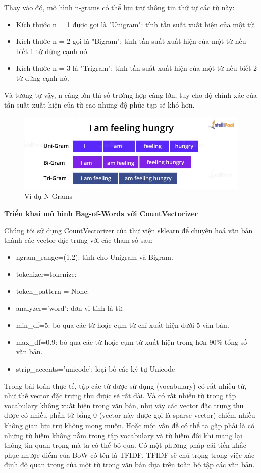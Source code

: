 \documentclass[12pt,a4paper,oneside]{book}
\begin{document}
	Thay vào đó, mô hình n-grams có thể lưu trữ thông tin thứ tự các từ này:
	\begin{itemize}
		\item Kích thước n = 1 được gọi là "Unigram": tính tần suất xuất hiện của một từ.
		\item Kích thước n = 2 gọi là "Bigram": tính tần suất xuất hiện của một từ nếu biết 1 từ đứng cạnh nó.
		\item Kích thước n = 3 là "Trigram": tính tần suất xuất hiện của một từ nếu biết 2 từ đứng cạnh nó.
	\end{itemize}
	Và tương tự vậy, n càng lớn thì số trường hợp càng lớn, tuy cho độ chính xác của tần suất xuất hiện của từ cao nhưng độ phức tạp sẽ khó hơn. 
	\begin{figure}[H]
		\begin{center}
			\includegraphics[width=0.8\columnwidth]{ngrams.jpg}
		\end{center}
		\caption{Ví dụ N-Grams}
	\end{figure}
	
	
	\textbf{Triển khai mô hình Bag-of-Words với CountVectorizer}
	
	Chúng tôi sử dụng CountVectorizer của thư viện sklearn để chuyến hoá văn bản thành các vector đặc trưng với các tham số sau:
	\begin{itemize}
		\item ngram\_range=(1,2): tính cho Unigram và Bigram.
		\item tokenizer=tokenize: 
		\item token\_pattern = None: 
		\item analyzer='word': đơn vị tính là từ.
		\item min\_df=5: bỏ qua các từ hoặc cụm từ chỉ xuất hiện dưới 5 văn bản.
		\item max\_df=0.9: bỏ qua các từ hoặc cụm từ xuất hiện trong hơn 90\% tổng số văn bản.
		\item strip\_accents='unicode': loại bỏ các ký tự Unicode
	\end{itemize}
	
	Trong bài toán thực tế, tập các từ được sử dụng (vocabulary) có rất nhiều từ, như thế vector đặc trưng thu được sẽ rất dài. Và có rất nhiều từ trong tập vocabulary không xuất hiện trong văn bản, như vậy các vector đặc trưng thu được có nhiều phần tử bằng 0 (vector này được gọi là sparse vector) chiếm nhiều không gian lưu trữ không mong muốn. Hoặc một vấn đề có thể ta gặp phải là có những từ hiếm không nằm trong tập vocabulary và từ hiếm đôi khi mang lại thông tin quan trọng mà ta có thể bỏ qua. Có một phương pháp cải tiến khắc phục nhược điểm của BoW có tên là TFIDF, TFIDF sẽ chú trọng trong việc xác định độ quan trọng của một từ trong văn bản dựa trên toàn bộ tập các văn bản. 
	
\end{document}
